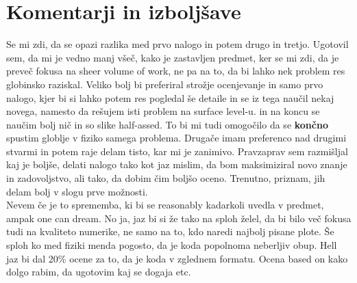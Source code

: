 \documentclass[a4paper]{article}
\begin{document}
\section{Komentarji in izboljšave}
Se mi zdi, da se opazi razlika med prvo nalogo in potem drugo in tretjo. Ugotovil sem, da mi je vedno manj všeč, 
kako je zastavljen predmet, ker se mi zdi, da je preveč fokusa na sheer volume of work, ne pa na to, da bi lahko nek 
problem res globinsko raziskal. Veliko bolj bi preferiral strožje ocenjevanje in samo prvo nalogo, kjer bi si lahko potem
res pogledal še detaile in se iz tega naučil nekaj novega, namesto da rešujem isti problem na surface level-u. in 
na koncu se naučim bolj nič in so slike half-assed. To bi mi tudi omogočilo da se \textbf{končno} spustim globlje v 
fiziko samega problema. Drugače imam preferenco nad drugimi stvarmi in potem raje delam tisto, kar mi je zanimivo. Pravzaprav
sem razmišljal kaj je boljše, delati nalogo tako kot jaz mislim, da bom maksimiziral novo znanje in zadovoljstvo, ali tako,
da dobim čim boljšo oceno. Trenutno, priznam, jih delam bolj v slogu prve možnosti. \\


Nevem če je to sprememba, ki bi se reasonably kadarkoli uvedla v predmet, ampak one can dream. No ja, jaz bi si že 
tako na sploh želel, da bi bilo več fokusa tudi na kvaliteto numerike, ne samo na to, kdo naredi najbolj pisane plote.
Še sploh ko med fiziki menda pogosto, da je koda popolnoma neberljiv obup. Hell jaz bi dal 20\% ocene za to, da je koda
v zglednem formatu. Ocena based on kako dolgo rabim, da ugotovim kaj se dogaja etc. \\
\end{document}
